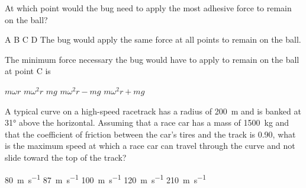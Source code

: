 \documentclass{../../oss-apphys-exam}
\begin{document}
\begin{multicols*}{2}
\begin{questions}

    \question At which point would the bug need to apply the most adhesive
    force to remain on the ball?
    \begin{choices}
      \choice A
      \choice B
      \choice C
      \choice D
      \choice The bug would apply the same force at all points to remain on the
      ball.
    \end{choices}
    \label{bug1}
   
    \question The minimum force necessary the bug would have to apply to remain
    on the ball at point C is
    \begin{choices}
      \choice $m\omega r$
      \choice $m\omega^2r$
      \choice $mg$
      \choice $m\omega^2r-mg$
      \choice $m\omega^2r+mg$
    \end{choices}
    \label{bug2}

    \question A typical curve on a high-speed racetrack has a radius of
    \SI{200}{\metre} and is banked at \ang{31} above the horizontal. Assuming
    that a race car has a mass of \SI{1500}{\kilo\gram} and that the
    coefficient of friction between the car's tires and the track is 0.90, what
    is the maximum speed at which a race car can travel through the curve and
    not slide toward the top of the track?
    \begin{choices}
      \choice\SI{80}{\metre\per\second}
      \choice\SI{87}{\metre\per\second}
      \choice\SI{100}{\metre\per\second}
      \choice\SI{120}{\metre\per\second}
      \choice\SI{210}{\metre\per\second}
    \end{choices}
    \columnbreak
        

\end{questions}
\end{multicols*}
\end{document}
